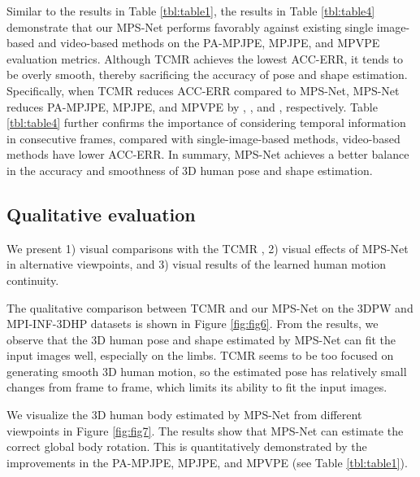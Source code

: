 \documentclass[10pt,twocolumn,letterpaper]{article}
\begin{document}
Similar to the results in Table \ref{tbl:table1}, the results in Table \ref{tbl:table4} demonstrate that our MPS-Net performs favorably against existing single image-based and video-based methods on the PA-MPJPE, MPJPE, and MPVPE evaluation metrics. Although TCMR achieves the lowest ACC-ERR, it tends to be overly smooth, thereby sacrificing the accuracy of pose and shape estimation. Specifically, when TCMR reduces ACC-ERR   compared to MPS-Net, MPS-Net reduces PA-MPJPE, MPJPE, and MPVPE by  ,  , and  , respectively. Table \ref{tbl:table4} further confirms the importance of considering temporal information in consecutive frames, \ie compared with single-image-based methods, video-based methods have lower ACC-ERR. In summary, MPS-Net achieves a better balance in the accuracy and smoothness of 3D human pose and shape estimation.\vspace{-4pt}

\subsection{Qualitative evaluation}\vspace{-4pt}



We present 1) visual comparisons with the TCMR \cite{choi2020beyond}, 2) visual effects of MPS-Net in alternative viewpoints, and 3) visual results of the learned human motion continuity.\vspace{2pt}

 The qualitative comparison between TCMR and our MPS-Net on the 3DPW and MPI-INF-3DHP datasets is shown in Figure \ref{fig:fig6}. From the results, we observe that the 3D human pose and shape estimated by MPS-Net can fit the input images well, especially on the limbs. TCMR seems to be too focused on generating smooth 3D human motion, so the estimated pose has relatively small changes from frame to frame, which limits its ability to fit the input images.\vspace{3pt}


 We visualize the 3D human body estimated by MPS-Net from different viewpoints in Figure \ref{fig:fig7}. The results show that MPS-Net can estimate the correct global body rotation. This is quantitatively demonstrated by the improvements in the PA-MPJPE, MPJPE, and MPVPE (see Table \ref{tbl:table1}).\vspace{1pt}
\end{document}
